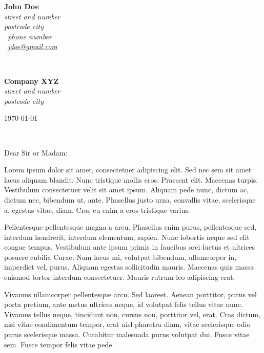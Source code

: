 \documentclass[11pt]{article}
\begin{document}
\sffamily   %
\hfill%
\begin{minipage}[t]{.6\textwidth}
\raggedleft%
{\bfseries John Doe}\\[.35ex]
\small\itshape%
street and number\\
postcode city\\[.35ex]
\Telefon~phone number\\
\Letter~\href{mailto:jdoe@gmail.com}{jdoe@gmail.com}
\end{minipage}\\[1em]
%
\begin{minipage}[t]{.4\textwidth}
\raggedright%
{\bfseries Company XYZ}\\[.35ex]
\small\itshape%
street and number\\
postcode city
\end{minipage}
\hfill %
\begin{minipage}[t]{.4\textwidth}
\raggedleft %
\today
\end{minipage}\\[2em]
\raggedright

Dear Sir or Madam:

Lorem ipsum dolor sit amet, consectetuer adipiscing elit. Sed nec sem
sit amet lacus aliquam blandit. Nunc tristique mollis eros. Praesent
elit. Maecenas turpis. Vestibulum consectetuer velit sit amet ipsum.
Aliquam pede nunc, dictum ac, dictum nec, bibendum ut, ante. Phasellus
justo urna, convallis vitae, scelerisque a, egestas vitae, diam. Cras eu
enim a eros tristique varius.

Pellentesque pellentesque magna a arcu. Phasellus enim purus,
pellentesque sed, interdum hendrerit, interdum elementum, sapien. Nunc
lobortis neque sed elit congue tempus. Vestibulum ante ipsum primis in
faucibus orci luctus et ultrices posuere cubilia Curae; Nam lacus mi,
volutpat bibendum, ullamcorper in, imperdiet vel, purus. Aliquam egestas
sollicitudin mauris. Maecenas quis massa euismod tortor interdum
consectetuer. Mauris rutrum leo adipiscing erat.

Vivamus ullamcorper pellentesque arcu. Sed laoreet. Aenean porttitor,
purus vel porta pretium, ante metus ultrices neque, id volutpat felis
tellus vitae nunc. Vivamus tellus neque, tincidunt non, cursus non,
porttitor vel, erat. Cras dictum, nisi vitae condimentum tempor, erat
nisl pharetra diam, vitae scelerisque odio purus scelerisque massa.
Curabitur malesuada purus volutpat dui. Fusce vitae sem. Fusce tempor
felis vitae pede.
\end{document}
